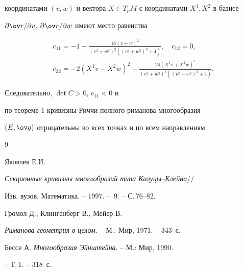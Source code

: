 координатами $(v,w)$ и вектора $X\in T_pM$ с координатами $X^1,X^2$ в базисе


$\p\ov r/\p v$, $\p\ov r/\p w$ имеют место равенства


\begin{gather*}


c_{11}=-1-\frac{16(v+w)^2}{(v^2+w^2)^2((v^2+w^2)^3+4)},\quad c_{12}=0,\\


c_{22}=-2(X^1v-X^2w)^2-


\frac{24(X^1 v+X^2 w)^2}{(v^2+w^2)^3((v^2+w^2)^3+4)}.


\end{gather*}


Следовательно, $\det C>0$, $c_{11}<0$ и


по теореме 1 кривизны Риччи полного риманова многообразия


$(E,\g)$ отрицательны во всех точках и по всем направлениям.





\begin{thebibliography}{9}





 Яковлев Е.И.


{\em Секционные кривизны многoобразий типа Калуцы--Клейна}//


Изв. вузов. Математика. -- 1997. -- \No\,9. -- С.\,76--82.




Громол Д., Клингенберг В., Мейер В.


{\em Риманова геометрия в целом}. -- М.: Мир, 1971. -- 343~с.




Бессе А. {\em Многообразия Эйнштейна}. -- М.: Мир, 1990.


-- Т.\,1. -- 318~с.





\end{thebibliography}





\vskip 2cm











\label{end}








